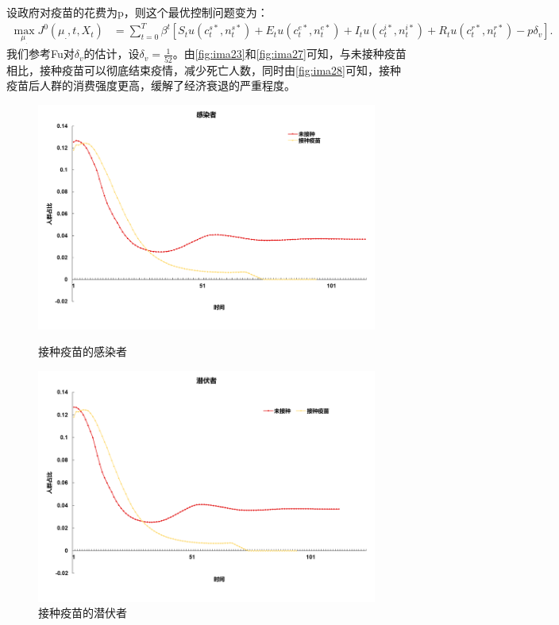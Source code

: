 设政府对疫苗的花费为p，则这个最优控制问题变为：
\begin{align}
    \max_{\mu_{.}}J^0(\mu_{.},t,X_t)&=\sum_{t=0}^{T} \beta^t[S_t u(c_t^{s*},n_t^{s*})+E_t u(c_t^{e*},n_t^{e*})+I_t u(c_t^{i*},n_t^{i*})+R_t u(c_t^{r*},n_t^{r*})-p \delta_v].
\end{align}
我们参考Fu\cite{fu2022optimal}对$\delta_v$的估计，设$\delta_v=\frac{1}{52}$。由\autoref{fig:ima23}和\autoref{fig:ima27}可知，与未接种疫苗相比，接种疫苗可以彻底结束疫情，减少死亡人数，同时由\autoref{fig:ima28}可知，接种疫苗后人群的消费强度更高，缓解了经济衰退的严重程度。

\begin{figure}[htbp]
	\centering
	\begin{minipage}{0.49\linewidth}
		\centering
		\includegraphics[width=0.9\linewidth]{fig/image055.png}
		\caption{接种疫苗的感染者}
		\label{fig:ima23}%
	\end{minipage}
	\begin{minipage}{0.49\linewidth}
		\centering
		\includegraphics[width=0.9\linewidth]{fig/image049.png}
		\caption{接种疫苗的潜伏者}
		\label{fig:ima24}%
	\end{minipage}
	

\end{figure}
